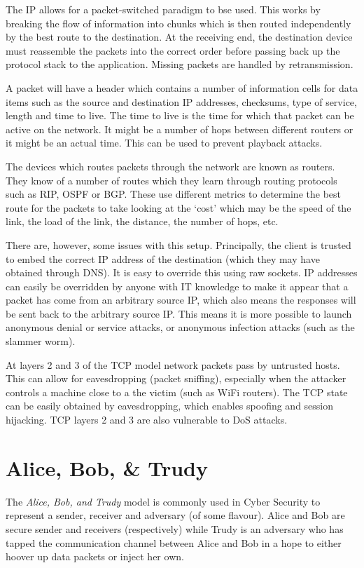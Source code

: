 The IP allows for a packet-switched paradigm to bse used. This works by breaking the flow of information into chunks which is then routed independently by the best route to the destination. At the receiving end, the destination device must reassemble the packets into the correct order before passing back up the protocol stack to the application. Missing packets are handled by retransmission.

A packet will have a header which contains a number of information cells for data items such as the source and destination IP addresses, checksums, type of service, length and time to live. The time to live is the time for which that packet can be active on the network. It might be a number of hops between different routers or it might be an actual time. This can be used to prevent playback attacks.

The devices which routes packets through the network are known as routers. They know of a number of routes which they learn through routing protocols such as RIP, OSPF or BGP. These use different metrics to determine the best route for the packets to take looking at the `cost' which may be the speed of the link, the load of the link, the distance, the number of hops, etc. 

There are, however, some issues with this setup. Principally, the client is trusted to embed the correct IP address of the destination (which they may have obtained through DNS). It is easy to override this using raw sockets. IP addresses can easily be overridden by anyone with IT knowledge to make it appear that a packet has come from an arbitrary source IP, which also means the responses will be sent back to the arbitrary source IP. This means it is more possible to launch anonymous denial or service attacks, or anonymous infection attacks (such as the slammer worm). 

At layers 2 and 3 of the TCP model network packets pass by untrusted hosts. This can allow for eavesdropping (packet sniffing), especially when the attacker controls a machine close to a the victim (such as WiFi routers). The TCP state can be easily obtained by eavesdropping, which enables spoofing and session hijacking. TCP layers 2 and 3 are also vulnerable to DoS attacks. 

\section{Alice, Bob, \& Trudy}
The \textit{Alice, Bob, and Trudy} model is commonly used in Cyber Security to represent a sender, receiver and adversary (of some flavour). Alice and Bob are secure sender and receivers (respectively) while Trudy is an adversary who has tapped the communication channel between Alice and Bob in a hope to either hoover up data packets or inject her own. 


